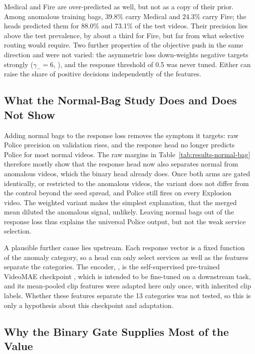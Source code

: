 Medical and Fire are over-predicted as well, but not as a copy of their prior.
Among anomalous training bags, 39.8\% carry Medical and 24.3\% carry Fire; the
heads predicted them for 88.0\% and 73.1\% of the test videos. Their precision
lies above the test prevalence, by about a third for Fire, but far from what
selective routing would require. Two further properties of the objective push
in the same direction and were not varied: the asymmetric loss down-weights
negative targets strongly ($\gamma_-=6$, \cite{ridnik2021asymmetric}), and the
response threshold of 0.5 was never tuned. Either can raise the share of
positive decisions independently of the features.

\subsection{What the Normal-Bag Study Does and Does Not Show}

Adding normal bags to the response loss removes the symptom it targets: raw
Police precision on validation rises, and the response head no longer
predicts Police for most normal videos. The raw margins in Table~\ref{tab:results-normal-bag}
therefore mostly show that the response head now also separates normal from
anomalous videos, which the binary head already does. Once both arms are gated
identically, or restricted to the anomalous videos, the variant does not differ
from the control beyond the seed spread, and Police still fires on every
Explosion video. The weighted variant makes the simplest explanation, that the
merged mean diluted the anomalous signal, unlikely. Leaving normal bags out of the
response loss thus explains the universal Police output, but not the weak
service selection.

A plausible further cause lies upstream. Each response vector is a fixed
function of the anomaly category, so a head can only select services as well as
the features separate the categories. The encoder,
, is the self-supervised pre-trained VideoMAE
checkpoint \cite{tong2022videomae}, which is intended to be fine-tuned on a
downstream task, and its mean-pooled clip features were adapted here only once,
with inherited clip labels. Whether these features separate the 13 categories
was not tested, so this is only a hypothesis about this checkpoint and adaptation.

\subsection{Why the Binary Gate Supplies Most of the Value}

